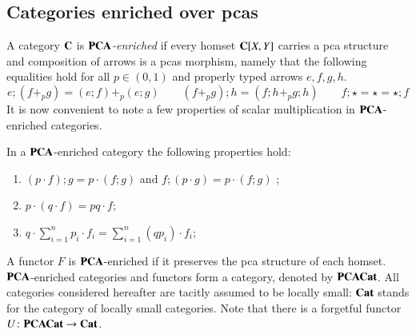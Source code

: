 \subsection{Categories enriched over pcas} A category $\mathbf{C}$ is \emph{$\mathbf{PCA}$-enriched} if every homset $\mathbf{C}[X,Y]$ carries a pca structure and composition of arrows is a pcas morphism, namely that the following equalities hold for all $p\in(0,1)$ and properly typed arrows $e,f,g,h$.
\begin{equation}\label{eq:enr}e; (f+_p g) = (e;f)+_p (e;g) \qquad (f+_pg) ;h= (f;h +_p g;h) \qquad f;\star =\star= \star;f\end{equation}
 It is now convenient to note a few properties of scalar multiplication in $\mathbf{PCA}$-enriched categories.
\begin{lemma}\label{lemma:initialproperties2}
In a $\mathbf{PCA}$-enriched category the following properties hold:
\begin{enumerate}
\item $(p\cdot f) ; g =p\cdot (f;g)$ and $f;(p\cdot g) = p\cdot ( f;g)$ ; \label{lemma:p;}
\item $p\cdot (q \cdot f) =pq \cdot f$; \label{lemma:pq}
\item $q\cdot\sum_{i=1}^{n}p_i\cdot f_i= \sum_{i=1}^{n} (qp_i)\cdot f_i$;\label{lemma q per somma}
\end{enumerate}
\end{lemma}


A functor $F$ is $\mathbf{PCA}$-enriched if it preserves the pca structure of each homset. $\mathbf{PCA}$-enriched categories and functors form a category, denoted by $\mathbf{PCACat}$.
All categories considered hereafter are tacitly assumed to be locally small: $\mathbf{Cat}$ stands  for the category of locally small categories. Note that there is a forgetful functor $U\colon \mathbf{PCACat} \to \mathbf{Cat}$.

